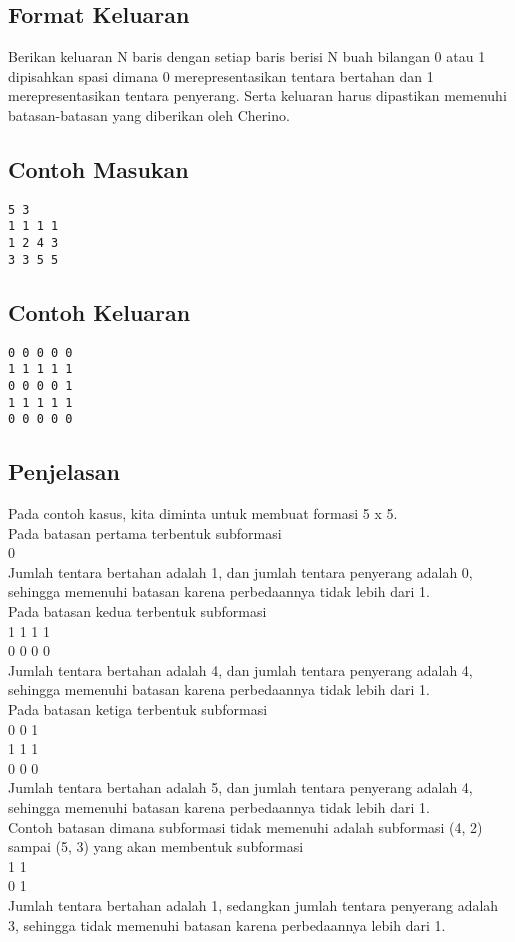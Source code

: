 \documentclass{article}
\begin{document}
\subsection*{Format Keluaran}

Berikan keluaran N baris dengan setiap baris berisi N buah bilangan 0 atau 1 dipisahkan spasi dimana 0 merepresentasikan tentara bertahan dan 1 merepresentasikan tentara penyerang. Serta keluaran harus dipastikan memenuhi batasan-batasan yang diberikan oleh Cherino.

\begin{multicols}{2}
\subsection*{Contoh Masukan}
\begin{lstlisting}
5 3
1 1 1 1
1 2 4 3
3 3 5 5
\end{lstlisting}
\columnbreak
\subsection*{Contoh Keluaran}
\begin{lstlisting}
0 0 0 0 0
1 1 1 1 1
0 0 0 0 1
1 1 1 1 1
0 0 0 0 0
\end{lstlisting}
\vfill
\null
\end{multicols}

\subsection*{Penjelasan}
Pada contoh kasus, kita diminta untuk membuat formasi 5 x 5.\\
Pada batasan pertama terbentuk subformasi\\
0\\
Jumlah tentara bertahan adalah 1, dan jumlah tentara penyerang adalah 0, sehingga memenuhi batasan karena perbedaannya tidak lebih dari 1.\\
    
Pada batasan kedua terbentuk subformasi\\
1 1 1 1\\
0 0 0 0\\
Jumlah tentara bertahan adalah 4, dan jumlah tentara penyerang adalah 4, sehingga memenuhi batasan karena perbedaannya tidak lebih dari 1.\\
    
Pada batasan ketiga terbentuk subformasi\\
0 0 1\\
1 1 1\\
0 0 0\\
Jumlah tentara bertahan adalah 5, dan jumlah tentara penyerang adalah 4, sehingga memenuhi batasan karena perbedaannya tidak lebih dari 1.\\

Contoh batasan dimana subformasi tidak memenuhi adalah subformasi (4, 2) sampai (5, 3) yang akan membentuk subformasi\\
1 1\\
0 1\\
Jumlah tentara bertahan adalah 1, sedangkan jumlah tentara penyerang adalah 3, sehingga tidak memenuhi batasan karena perbedaannya lebih dari 1.\\

    
\end{document}
